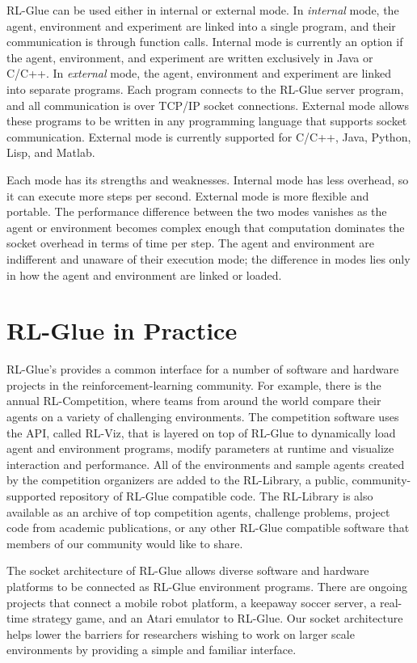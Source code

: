 \documentclass[twoside,11pt]{article}
\begin{document}
 RL-Glue can be used either in  internal or external mode.  In \textit{internal} mode, the agent, environment and experiment are linked into a single program, and their communication is through function calls.  Internal mode is currently an option if the agent, environment, and experiment are written exclusively in Java or C/C++.  In  \textit{external} mode, the agent, environment and experiment are linked into separate programs.  Each program connects to the RL-Glue server program, and all communication is over TCP/IP socket connections. External mode allows these programs to be written in any programming language that supports socket communication.  External mode is currently supported for C/C++, Java, Python, Lisp, and Matlab.

Each mode has its strengths and weaknesses. Internal mode has less overhead, so it can execute more steps per second. External mode is more flexible and portable.  The performance difference between the two modes vanishes as the agent or environment becomes complex enough that computation dominates the socket overhead in terms of time per step.  The agent and environment are indifferent and unaware of their execution mode; the difference in modes lies only in how the agent and environment are linked or loaded.

\section{RL-Glue in Practice}
\vspace{-0.2cm}
RL-Glue's provides a common interface for a number of software and hardware projects in the reinforcement-learning community. For example, there is the annual RL-Competition, where teams from around the world compare their agents on a variety of challenging environments.  The competition software uses the API, called RL-Viz, that is layered on top of RL-Glue to dynamically load agent and environment programs, modify parameters at runtime and visualize interaction and performance.  All of the environments and sample agents created by the competition organizers are added to the RL-Library, a public, community-supported repository of RL-Glue compatible code. The RL-Library is also available as an archive of top competition agents, challenge problems, project code from academic publications, or any other RL-Glue compatible software that members of our community would like to share.


The socket architecture of RL-Glue allows diverse software and hardware platforms to be connected as RL-Glue environment programs.  There are ongoing projects that connect a mobile robot platform, a keepaway soccer server, a real-time strategy game, and an Atari emulator to RL-Glue. Our socket architecture helps lower the barriers for researchers wishing to work on larger scale environments by providing a simple and familiar interface. %
\end{document}
